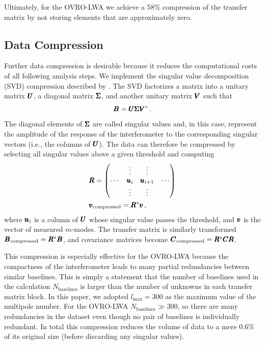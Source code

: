 \begin{bibunit}
Ultimately, for the OVRO-LWA we achieve a 58\% compression of the transfer matrix by not storing
elements that are approximately zero.

\subsection{Data Compression}\label{sec:compression}

Further data compression is desirable because it reduces the computational costs of all following
analysis steps. We implement the singular value decomposition (SVD) compression described by
\citep{2014ApJ...781...57S, 2015PhRvD..91h3514S}. The SVD factorizes a matrix into a unitary matrix
$\pmb U$, a diagonal matrix $\pmb\Sigma$, and another unitary matrix $\pmb V$ such that
\begin{equation}
    \pmb B = \pmb U \pmb\Sigma \pmb V^*\,.
\end{equation}
The diagonal elements of $\pmb\Sigma$ are called singular values and, in this case, represent the
amplitude of the response of the interferometer to the corresponding singular vectors (i.e., the
columns of $\pmb U$). The data can therefore be compressed by selecting all singular values above a
given threshold and computing
\begin{align}
    &\pmb R = \begin{pmatrix}
        & \vdots & \vdots & \\
        \cdots & \pmb u_{i} & \pmb u_{i+1} & \cdots \\
        & \vdots & \vdots & \\
    \end{pmatrix} \\
    &\pmb v_\text{compressed} = \pmb R^*\pmb v\,,
\end{align}
where $\pmb u_i$ is a column of $\pmb U$ whose singular value passes the threshold, and $\pmb v$ is the
vector of measured $m$-modes. The transfer matrix is similarly transformed $\pmb B_\text{compressed} =
\pmb R^*\pmb B$, and covariance matrices become $\pmb C_\text{compressed} = \pmb R^*\pmb C\pmb R$.

This compression is especially effective for the OVRO-LWA because the compactness of the
interferometer leads to many partial redundancies between similar baselines. This is simply a
statement that the number of baselines used in the calculation $N_\text{baselines}$ is larger than
the number of unknowns in each transfer matrix block. In this paper, we adopted $l_\text{max} = 300$
as the maximum value of the multipole number. For the OVRO-LWA $N_\text{baselines} \gg 300$, so
there are many redundancies in the dataset even though no pair of baselines is individually
redundant. In total this compression reduces the volume of data to a mere 0.6\% of its original
size (before discarding any singular values).


\end{bibunit}
